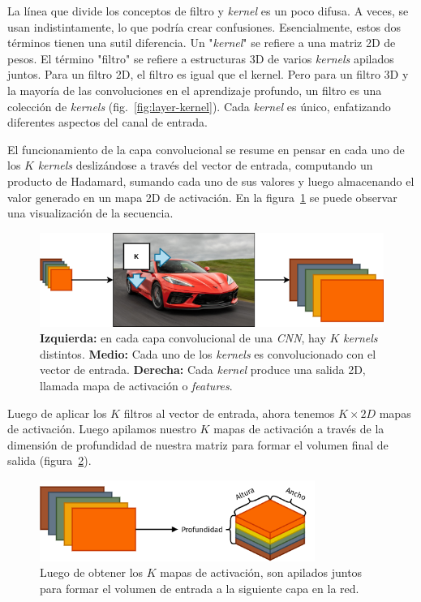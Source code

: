 \documentclass[a4paper,12pt]{article}
\begin{document}
La línea que divide los conceptos de filtro y \textit{kernel} es un poco difusa. A veces, se usan indistintamente, lo que podría crear confusiones. Esencialmente, estos dos términos tienen una sutil diferencia. Un "\textit{kernel}" se refiere a una matriz 2D de pesos. El término "filtro" se refiere a estructuras 3D de varios \textit{kernels} apilados juntos. Para un filtro 2D, el filtro es igual que el kernel. Pero para un filtro 3D y la mayoría de las convoluciones en el aprendizaje profundo, un filtro es una colección de \textit{kernels} (fig.~\ref{fig:layer-kernel}). Cada \textit{kernel} es único, enfatizando diferentes aspectos del canal de entrada.

\clearpage

El funcionamiento de la capa convolucional se resume en pensar en cada uno de los $K$ \textit{kernels} deslizándose a través del vector de entrada, computando un producto de Hadamard, sumando cada uno de sus valores y luego almacenando el valor generado en un mapa 2D de activación. En la figura~\ref{fig:conv-mechanism} se puede observar una visualización de la secuencia.

\begin{figure}[H]
	\begin{center}				
		\includegraphics[width=1\textwidth]{feature-map-clean.png}
		\caption{\textbf{Izquierda:} en cada capa convolucional de una \textit{CNN}, hay $K$ \textit{kernels} distintos. \textbf{Medio:} Cada uno de los \textit{kernels} es convolucionado con el vector de entrada. \textbf{Derecha:} Cada \textit{kernel} produce una salida 2D, llamada mapa de activación o \textit{features}.}
		\label{fig:conv-mechanism}
	\end{center}
\end{figure}

Luego de aplicar los $K$ filtros al vector de entrada, ahora tenemos $K \times 2D$ mapas de activación. Luego apilamos nuestro $K$ mapas de activación a través de la dimensión de profundidad de nuestra matriz para formar el volumen final de salida (figura~\ref{fig:k-maps}).

\begin{figure}[H]
	\begin{center}				
		\includegraphics[width=0.8\textwidth]{k-activation-map.png}
		\caption{Luego de obtener los $K$ mapas de activación, son apilados juntos para formar el volumen de entrada a la siguiente capa en la red.}
		\label{fig:k-maps}
	\end{center}
\end{figure}
\end{document}
